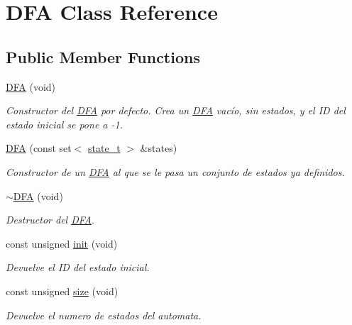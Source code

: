 \hypertarget{class_d_f_a}{}\section{D\+FA Class Reference}
\label{class_d_f_a}
\subsection*{Public Member Functions}
\begin{DoxyCompactItemize}
\item 
\mbox{\label{class_d_f_a_a22147c876a89b6342512b13b20dd5fcd}} 
\hyperlink{class_d_f_a_a22147c876a89b6342512b13b20dd5fcd}{D\+FA} (void)
\begin{DoxyCompactList}\small\item\em Constructor del \hyperlink{class_d_f_a}{D\+FA} por defecto. Crea un \hyperlink{class_d_f_a}{D\+FA} vacío, sin estados, y el ID del estado inicial se pone a -\/1. \end{DoxyCompactList}\item 
\hyperlink{class_d_f_a_a58748588a492bf8c3f5dd9bb1310aa41}{D\+FA} (const set$<$ \hyperlink{classstate__t}{state\+\_\+t} $>$ \&states)
\begin{DoxyCompactList}\small\item\em Constructor de un \hyperlink{class_d_f_a}{D\+FA} al que se le pasa un conjunto de estados ya definidos. \end{DoxyCompactList}\item 
\mbox{\label{class_d_f_a_aa6398a02d0f2d3a57cee0c7d8b3ec9e1}} 
\hyperlink{class_d_f_a_aa6398a02d0f2d3a57cee0c7d8b3ec9e1}{$\sim$\+D\+FA} (void)
\begin{DoxyCompactList}\small\item\em Destructor del \hyperlink{class_d_f_a}{D\+FA}. \end{DoxyCompactList}\item 
const unsigned \hyperlink{class_d_f_a_a97e39f09fca7cbe4d2674797b0fdaabc}{init} (void)
\begin{DoxyCompactList}\small\item\em Devuelve el ID del estado inicial. \end{DoxyCompactList}\item 
const unsigned \hyperlink{class_d_f_a_a60333433beecab40b2e6eb8874de8524}{size} (void)
\begin{DoxyCompactList}\small\item\em Devuelve el numero de estados del automata. \end{DoxyCompactList}\item 

\end{DoxyCompactItemize}
